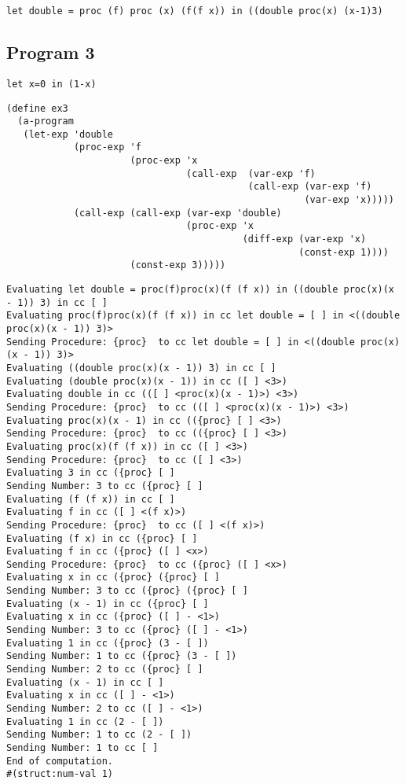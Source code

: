 \documentclass[../main.tex]{subfiles}
\begin{document}
\begin{lstlisting}
let double = proc (f) proc (x) (f(f x)) in ((double proc(x) (x-1)3)
\end{lstlisting}

\subsection{Program 3}

\begin{lstlisting}
let x=0 in (1-x)
\end{lstlisting}

\begin{lstlisting}
(define ex3
  (a-program
   (let-exp 'double
            (proc-exp 'f
                      (proc-exp 'x
                                (call-exp  (var-exp 'f)
                                           (call-exp (var-exp 'f)
                                                     (var-exp 'x)))))
            (call-exp (call-exp (var-exp 'double)
                                (proc-exp 'x
                                          (diff-exp (var-exp 'x)
                                                    (const-exp 1))))
                      (const-exp 3)))))
\end{lstlisting}

\begin{lstlisting}
Evaluating let double = proc(f)proc(x)(f (f x)) in ((double proc(x)(x - 1)) 3) in cc [ ]
Evaluating proc(f)proc(x)(f (f x)) in cc let double = [ ] in <((double proc(x)(x - 1)) 3)>
Sending Procedure: {proc}  to cc let double = [ ] in <((double proc(x)(x - 1)) 3)>
Evaluating ((double proc(x)(x - 1)) 3) in cc [ ]
Evaluating (double proc(x)(x - 1)) in cc ([ ] <3>)
Evaluating double in cc (([ ] <proc(x)(x - 1)>) <3>)
Sending Procedure: {proc}  to cc (([ ] <proc(x)(x - 1)>) <3>)
Evaluating proc(x)(x - 1) in cc (({proc} [ ] <3>)
Sending Procedure: {proc}  to cc (({proc} [ ] <3>)
Evaluating proc(x)(f (f x)) in cc ([ ] <3>)
Sending Procedure: {proc}  to cc ([ ] <3>)
Evaluating 3 in cc ({proc} [ ]
Sending Number: 3 to cc ({proc} [ ]
Evaluating (f (f x)) in cc [ ]
Evaluating f in cc ([ ] <(f x)>)
Sending Procedure: {proc}  to cc ([ ] <(f x)>)
Evaluating (f x) in cc ({proc} [ ]
Evaluating f in cc ({proc} ([ ] <x>)
Sending Procedure: {proc}  to cc ({proc} ([ ] <x>)
Evaluating x in cc ({proc} ({proc} [ ]
Sending Number: 3 to cc ({proc} ({proc} [ ]
Evaluating (x - 1) in cc ({proc} [ ]
Evaluating x in cc ({proc} ([ ] - <1>)
Sending Number: 3 to cc ({proc} ([ ] - <1>)
Evaluating 1 in cc ({proc} (3 - [ ])
Sending Number: 1 to cc ({proc} (3 - [ ])
Sending Number: 2 to cc ({proc} [ ]
Evaluating (x - 1) in cc [ ]
Evaluating x in cc ([ ] - <1>)
Sending Number: 2 to cc ([ ] - <1>)
Evaluating 1 in cc (2 - [ ])
Sending Number: 1 to cc (2 - [ ])
Sending Number: 1 to cc [ ]
End of computation.
#(struct:num-val 1)
\end{lstlisting}
\end{document}
